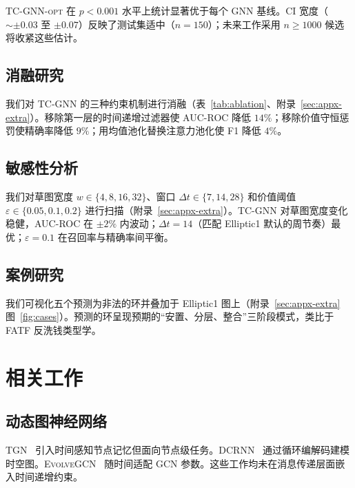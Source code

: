 \documentclass[journal,onecolumn]{IEEEtran}
\newcommand{\eps}{\varepsilon}
\begin{document}
\textsc{TC-GNN-opt} 在 $p < 0.001$ 水平上统计显著优于每个 GNN 基线。CI 宽度（$\sim \pm 0.03$ 至 $\pm 0.07$）反映了测试集适中（$n = 150$）；未来工作采用 $n \geq 1000$ 候选将收紧这些估计。

\subsection{消融研究}
\label{sec:exp-ablation}

我们对 TC-GNN 的三种约束机制进行消融（表~\ref{tab:ablation}、附录~\ref{sec:appx-extra}）。移除第一层的时间递增过滤器使 AUC-ROC 降低 $14\%$；移除价值守恒惩罚使精确率降低 $9\%$；用均值池化替换注意力池化使 F1 降低 $4\%$。

\subsection{敏感性分析}
\label{sec:exp-sensitivity}

我们对草图宽度 $w \in \{4, 8, 16, 32\}$、窗口 $\Delta t \in \{7, 14, 28\}$ 和价值阈值 $\eps \in \{0.05, 0.1, 0.2\}$ 进行扫描（附录~\ref{sec:appx-extra}）。TC-GNN 对草图宽度变化稳健，AUC-ROC 在 $\pm 2\%$ 内波动；$\Delta t = 14$（匹配 Elliptic1 默认的周节奏）最优；$\eps = 0.1$ 在召回率与精确率间平衡。

\subsection{案例研究}
\label{sec:exp-case}

我们可视化五个预测为非法的环并叠加于 Elliptic1 图上（附录~\ref{sec:appx-extra} 图~\ref{fig:cases}）。预测的环呈现预期的``安置、分层、整合''三阶段模式，类比于 FATF 反洗钱类型学。

\section{相关工作}
\label{sec:related}

\subsection{动态图神经网络}
\label{sec:related-dgnn}

\textsc{TGN}~\cite{tgn2020} 引入时间感知节点记忆但面向节点级任务。\textsc{DCRNN}~\cite{dcrnn2018} 通过循环编解码建模时空图。\textsc{EvolveGCN}~\cite{evolvegcn2020} 随时间适配 GCN 参数。这些工作均未在消息传递层面嵌入时间递增约束。
\end{document}
